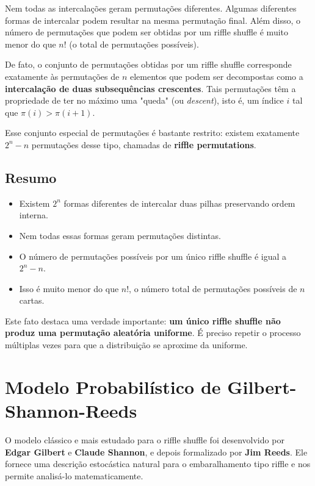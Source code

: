 \documentclass[12pt]{article}
\begin{document}
Nem todas as intercalações geram permutações diferentes. Algumas diferentes formas de intercalar podem resultar na mesma permutação final. Além disso, o número de permutações que podem ser obtidas por um riffle shuffle é muito menor do que $n!$ (o total de permutações possíveis).

De fato, o conjunto de permutações obtidas por um riffle shuffle corresponde exatamente às permutações de $n$ elementos que podem ser decompostas como a \textbf{intercalação de duas subsequências crescentes}. Tais permutações têm a propriedade de ter no máximo uma "queda" (ou \textit{descent}), isto é, um índice $i$ tal que $\pi(i) > \pi(i+1)$.

Esse conjunto especial de permutações é bastante restrito: existem exatamente $2^n - n$ permutações desse tipo, chamadas de \textbf{riffle permutations}.

\subsection*{Resumo}

\begin{itemize}
    \item Existem $2^n$ formas diferentes de intercalar duas pilhas preservando ordem interna.
    \item Nem todas essas formas geram permutações distintas.
    \item O número de permutações possíveis por um único riffle shuffle é igual a $2^n - n$.
    \item Isso é muito menor do que $n!$, o número total de permutações possíveis de $n$ cartas.
\end{itemize}

Este fato destaca uma verdade importante: \textbf{um único riffle shuffle não produz uma permutação aleatória uniforme}. É preciso repetir o processo múltiplas vezes para que a distribuição se aproxime da uniforme.

\section{Modelo Probabilístico de Gilbert-Shannon-Reeds}

O modelo clássico e mais estudado para o riffle shuffle foi desenvolvido por \textbf{Edgar Gilbert} e \textbf{Claude Shannon}, e depois formalizado por \textbf{Jim Reeds}. Ele fornece uma descrição estocástica natural para o embaralhamento tipo riffle e nos permite analisá-lo matematicamente.
\end{document}
